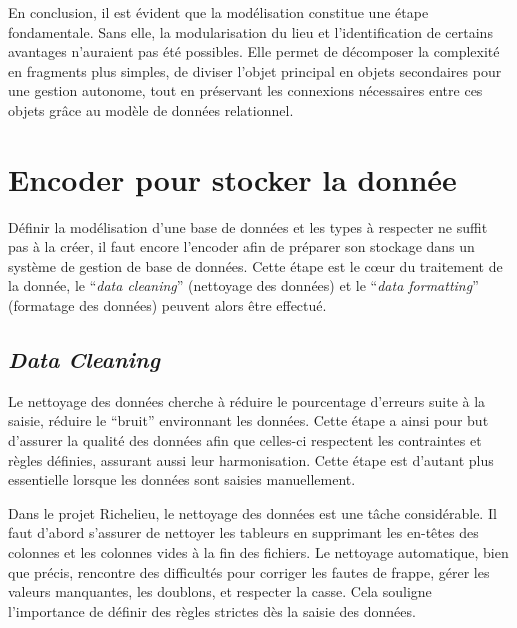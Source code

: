 En conclusion, il est évident que la modélisation constitue une étape fondamentale. Sans elle, la modularisation du lieu et l'identification de certains avantages n'auraient pas été possibles. Elle permet de décomposer la complexité en fragments plus simples, de diviser l'objet principal en objets secondaires pour une gestion autonome, tout en préservant les connexions nécessaires entre ces objets grâce au modèle de données relationnel.

\section{Encoder pour stocker la donnée}
Définir la modélisation d'une base de données et les types à respecter ne suffit pas à la créer, il faut encore l'encoder afin de préparer son stockage dans un système de gestion de base de données. Cette étape est le cœur du traitement de la donnée, le \enquote{\textit{data cleaning}} (nettoyage des données) et le \enquote{\textit{data formatting}} (formatage des données) peuvent alors être effectué.

\subsection{\textit{Data Cleaning}}
Le nettoyage des données cherche à réduire le pourcentage d'erreurs suite à la saisie, réduire le \enquote{bruit} environnant les données. Cette étape a ainsi pour but d'assurer la qualité des données afin que celles-ci respectent les contraintes et règles définies, assurant aussi leur harmonisation. Cette étape est d'autant plus essentielle lorsque les données sont saisies manuellement. 

Dans le projet Richelieu, le nettoyage des données est une tâche considérable. Il faut d'abord s'assurer de nettoyer les tableurs en supprimant les en-têtes des colonnes et les colonnes vides à la fin des fichiers. Le nettoyage automatique, bien que précis, rencontre des difficultés pour corriger les fautes de frappe, gérer les valeurs manquantes, les doublons, et respecter la casse. Cela souligne l'importance de définir des règles strictes dès la saisie des données.

